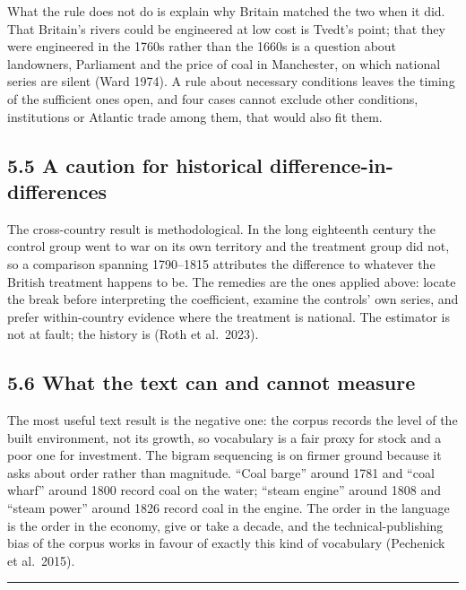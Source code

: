 \documentclass[
  11pt,
]{article}
\begin{document}
What the rule does not do is explain why Britain matched the two when it
did. That Britain's rivers could be engineered at low cost is Tvedt's
point; that they were engineered in the 1760s rather than the 1660s is a
question about landowners, Parliament and the price of coal in
Manchester, on which national series are silent (Ward 1974). A rule
about necessary conditions leaves the timing of the sufficient ones
open, and four cases cannot exclude other conditions, institutions or
Atlantic trade among them, that would also fit them.

\subsection{5.5 A caution for historical
difference-in-differences}\label{a-caution-for-historical-difference-in-differences}

The cross-country result is methodological. In the long eighteenth
century the control group went to war on its own territory and the
treatment group did not, so a comparison spanning 1790--1815 attributes
the difference to whatever the British treatment happens to be. The
remedies are the ones applied above: locate the break before
interpreting the coefficient, examine the controls' own series, and
prefer within-country evidence where the treatment is national. The
estimator is not at fault; the history is (Roth et al.~2023).

\subsection{5.6 What the text can and cannot
measure}\label{what-the-text-can-and-cannot-measure}

The most useful text result is the negative one: the corpus records the
level of the built environment, not its growth, so vocabulary is a fair
proxy for stock and a poor one for investment. The bigram sequencing is
on firmer ground because it asks about order rather than magnitude.
``Coal barge'' around 1781 and ``coal wharf'' around 1800 record coal on
the water; ``steam engine'' around 1808 and ``steam power'' around 1826
record coal in the engine. The order in the language is the order in the
economy, give or take a decade, and the technical-publishing bias of the
corpus works in favour of exactly this kind of vocabulary (Pechenick et
al.~2015).

\begin{center}\rule{0.5\linewidth}{0.5pt}\end{center}
\end{document}
